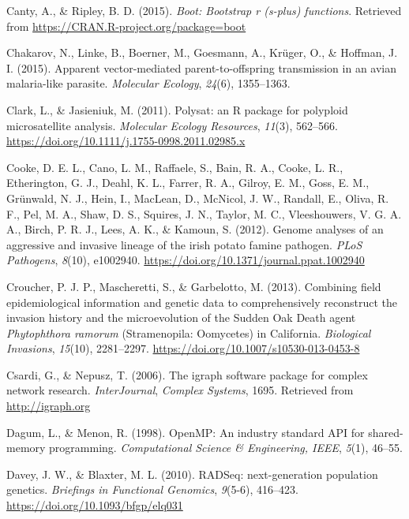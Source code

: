 \documentclass[double,11pt]{beavtex}
\begin{document}
  \hypertarget{ref-canty2015boot}{}
  Canty, A., \& Ripley, B. D. (2015). \emph{Boot: Bootstrap r (s-plus)
  functions}. Retrieved from \url{https://CRAN.R-project.org/package=boot}
  
  \hypertarget{ref-chakarov2015apparent}{}
  Chakarov, N., Linke, B., Boerner, M., Goesmann, A., Krüger, O., \&
  Hoffman, J. I. (2015). Apparent vector-mediated parent-to-offspring
  transmission in an avian malaria-like parasite. \emph{Molecular
  Ecology}, \emph{24}(6), 1355--1363.
  
  \hypertarget{ref-polysat}{}
  Clark, L., \& Jasieniuk, M. (2011). Polysat: an R package for polyploid
  microsatellite analysis. \emph{Molecular Ecology Resources},
  \emph{11}(3), 562--566.
  \url{https://doi.org/10.1111/j.1755-0998.2011.02985.x}
  
  \hypertarget{ref-cooke2012genome}{}
  Cooke, D. E. L., Cano, L. M., Raffaele, S., Bain, R. A., Cooke, L. R.,
  Etherington, G. J., Deahl, K. L., Farrer, R. A., Gilroy, E. M., Goss, E.
  M., Grünwald, N. J., Hein, I., MacLean, D., McNicol, J. W., Randall, E.,
  Oliva, R. F., Pel, M. A., Shaw, D. S., Squires, J. N., Taylor, M. C.,
  Vleeshouwers, V. G. A. A., Birch, P. R. J., Lees, A. K., \& Kamoun, S.
  (2012). Genome analyses of an aggressive and invasive lineage of the
  irish potato famine pathogen. \emph{PLoS Pathogens}, \emph{8}(10),
  e1002940. \url{https://doi.org/10.1371/journal.ppat.1002940}
  
  \hypertarget{ref-croucher2013combining}{}
  Croucher, P. J. P., Mascheretti, S., \& Garbelotto, M. (2013). Combining
  field epidemiological information and genetic data to comprehensively
  reconstruct the invasion history and the microevolution of the Sudden
  Oak Death agent \emph{Phytophthora ramorum} (Stramenopila: Oomycetes) in
  California. \emph{Biological Invasions}, \emph{15}(10), 2281--2297.
  \url{https://doi.org/10.1007/s10530-013-0453-8}
  
  \hypertarget{ref-csardi2006igraph}{}
  Csardi, G., \& Nepusz, T. (2006). The igraph software package for
  complex network research. \emph{InterJournal}, \emph{Complex Systems},
  1695. Retrieved from \url{http://igraph.org}
  
  \hypertarget{ref-dagum1998openmp}{}
  Dagum, L., \& Menon, R. (1998). OpenMP: An industry standard API for
  shared-memory programming. \emph{Computational Science \& Engineering,
  IEEE}, \emph{5}(1), 46--55.
  
  \hypertarget{ref-davey2010rad}{}
  Davey, J. W., \& Blaxter, M. L. (2010). RADSeq: next-generation
  population genetics. \emph{Briefings in Functional Genomics},
  \emph{9}(5-6), 416--423. \url{https://doi.org/10.1093/bfgp/elq031}
  
\end{document}
